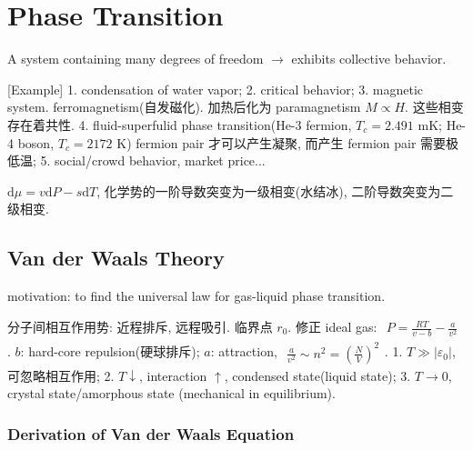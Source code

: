 \documentclass[../../main.tex]{subfiles}
\begin{document}
\section{Phase Transition}
A system containing many degrees of freedom $\rightarrow$ exhibits collective behavior.

[Example] 1. condensation of water vapor; 2. critical behavior; 3. magnetic system. ferromagnetism(自发磁化). 加热后化为 paramagnetism $M\propto H$. 这些相变存在着共性. 4. fluid-superfulid phase transition(He-3 fermion, $T_{c} = 2.491\text{ mK}$; He-4 boson, $T_{c} = 2172\text{ K}$) fermion pair 才可以产生凝聚, 而产生 fermion pair 需要极低温; 5. social/crowd behavior, market price...

$\mathrm{d}\mu = v\mathrm{d}P - s\mathrm{d}T$, 化学势的一阶导数突变为一级相变(水结冰), 二阶导数突变为二级相变. 

\subsection{Van der Waals Theory}
motivation: to find the universal law for gas-liquid phase transition. 

分子间相互作用势: 近程排斥, 远程吸引. 临界点 $r_{0}$. 修正 ideal gas: $\begin{aligned}
    P = \frac{RT}{v-b} - \frac{a}{v^{2}}
\end{aligned}$. $b$: hard-core repulsion(硬球排斥); $a$: attraction, $\begin{aligned}
    \frac{a}{v^{2}} \sim n^{2} = \left(\frac{N}{V}\right)^{2}
\end{aligned}$. 1. $T\gg |\varepsilon_{0}|$, 可忽略相互作用; 2. $T\downarrow$, interaction $\uparrow$, condensed state(liquid state); 3. $T\rightarrow 0$, crystal state/amorphous state (mechanical in equilibrium).

\subsubsection{Derivation of Van der Waals Equation}
\end{document}
